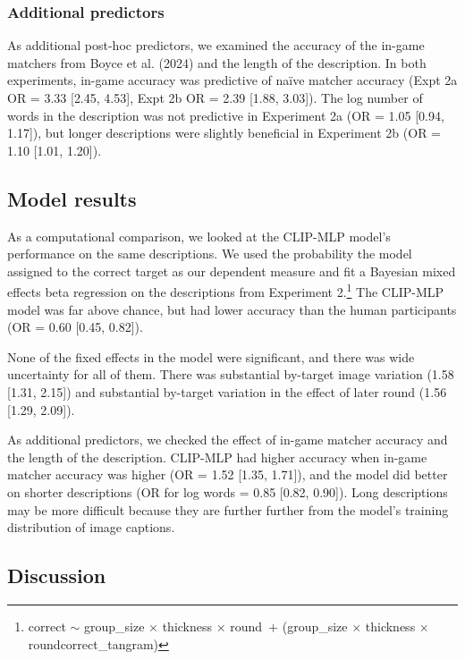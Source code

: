 \documentclass[10pt, letterpaper]{article}
\begin{document}
\subsubsection{Additional predictors}\label{additional-predictors}

As additional post-hoc predictors, we examined the accuracy of the
in-game matchers from Boyce et al. (2024) and the length of the
description. In both experiments, in-game accuracy was predictive of
naïve matcher accuracy (Expt 2a OR = 3.33 {[}2.45, 4.53{]}, Expt 2b OR =
2.39 {[}1.88, 3.03{]}). The log number of words in the description was
not predictive in Experiment 2a (OR = 1.05 {[}0.94, 1.17{]}), but longer
descriptions were slightly beneficial in Experiment 2b (OR = 1.10
{[}1.01, 1.20{]}).

\subsection{Model results}\label{model-results}

As a computational comparison, we looked at the CLIP-MLP model's
performance on the same descriptions. We used the probability the model
assigned to the correct target as our dependent measure and fit a
Bayesian mixed effects beta regression on the descriptions from
Experiment 2.\footnote{correct \({\sim}\) group\_size \({\times}\)
  thickness \({\times}\) round~\({+}\) (group\_size \({\times}\)
  thickness \({\times}\) round\textbar correct\_tangram)} The CLIP-MLP
model was far above chance, but had lower accuracy than the human
participants (OR = 0.60 {[}0.45, 0.82{]}).

None of the fixed effects in the model were significant, and there was
wide uncertainty for all of them. There was substantial by-target image
variation (1.58 {[}1.31, 2.15{]}) and substantial by-target variation in
the effect of later round (1.56 {[}1.29, 2.09{]}).

As additional predictors, we checked the effect of in-game matcher
accuracy and the length of the description. CLIP-MLP had higher accuracy
when in-game matcher accuracy was higher (OR = 1.52 {[}1.35, 1.71{]}),
and the model did better on shorter descriptions (OR for log words =
0.85 {[}0.82, 0.90{]}). Long descriptions may be more difficult because
they are further further from the model's training distribution of image
captions.

\subsection{Discussion}\label{discussion}
\end{document}

